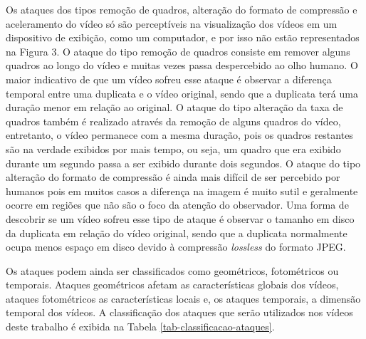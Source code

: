 Os ataques dos tipos remoção de quadros, alteração do formato de compressão e aceleramento do vídeo só são perceptíveis na visualização dos vídeos em um dispositivo de exibição, como um computador, e por isso não estão representados na Figura 3. O ataque do tipo remoção de quadros consiste em remover alguns quadros ao longo do vídeo e muitas vezes passa despercebido ao olho humano. O maior indicativo de que um vídeo sofreu esse ataque é observar a diferença temporal entre uma duplicata e o vídeo original, sendo que a duplicata terá uma duração menor em relação ao original. O ataque do tipo alteração da taxa de quadros também é realizado através da remoção de alguns quadros do vídeo, entretanto, o vídeo permanece com a mesma duração, pois os quadros restantes são na verdade exibidos por mais tempo, ou seja, um quadro que era exibido durante um segundo passa a ser exibido durante dois segundos. O ataque do tipo alteração do formato de compressão é ainda mais difícil de ser percebido por humanos pois em muitos casos a diferença na imagem é muito sutil e geralmente ocorre em regiões que não são o foco da atenção do observador. Uma forma de descobrir se um vídeo sofreu esse tipo de ataque é observar o tamanho em disco da duplicata em relação do vídeo original, sendo que a duplicata normalmente ocupa menos espaço em disco devido à compressão \textit{lossless} do formato JPEG.

Os ataques podem ainda ser classificados como geométricos, fotométricos ou temporais. Ataques geométricos afetam as características globais dos vídeos, ataques fotométricos as características locais e, os ataques temporais, a dimensão temporal dos vídeos. A classificação dos ataques que serão utilizados nos vídeos deste trabalho é exibida na Tabela \ref{tab-classificacao-ataques}.

